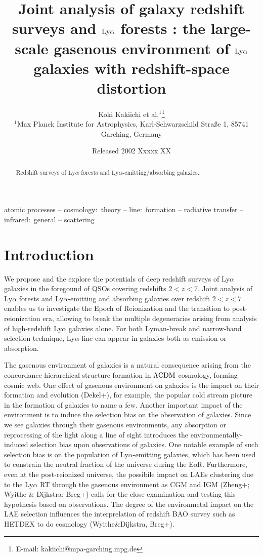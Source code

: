 \documentclass[useAMS,usenatbib,twocolumn]{mn2e}
\title[$\LyA$ forests and $\LyA$ galaxy surveys]
  {Joint analysis of galaxy redshift surveys and $\LyA$ forests \Rmnum{1}: \newline
  the large-scale gasenous environment of $\LyA$ galaxies 
  with redshift-space distortion}
\author[K. Kakiichi et al.]
{Koki Kakiichi et al,$^{1}$\thanks{E-mail: kakiichi@mpa-garching.mpg.de}
\\
$^1$Max Planck Institute for Astrophysics, Karl-Schwarzschild Stra\ss e 1, 85741 Garching, Germany
}
\date{Released 2002 Xxxxx XX}
\newcommand{\LyA}{\mbox{Ly}\alpha}
\begin{document}
\maketitle

\begin{abstract}
Redshift surveys of $\LyA$ forests and $\LyA$-emitting/absorbing galaxies. 
\end{abstract}

\begin{keywords}
atomic processes -- cosmology:\ theory -- line:\ formation -- radiative
transfer -- infrared:\ general -- scattering
\end{keywords}

\section{Introduction}
We propose and the explore the potentials of deep redshift surveys
of $\LyA$ galaxies in the foregound of QSOs covering redshifts $2<z<7$.
Joint analysis of $\LyA$ forests and $\LyA$-emitting and absorbing galaxies
over redshift $2<z<7$ enables us to investigate the Epoch of Reionization
and the transition to post-reionization era, allowing to break the multiple 
degeneracies arising from analysis of high-redshift $\LyA$ galaxies alone.
For both Lyman-break and narrow-band selection technique, $\LyA$ line can 
appear in galaxies both as emission or absorption.

The gasenous environment of galaxies is a natural consequence arising from 
the concordance hierarchical structure formation in $\rm{\Lambda CDM}$
cosmology, forming cosmic web. One effect of gasenous environment on
galaxies is the impact on their formation and evolution (Dekel+),
for example, the popular cold stream picture in the formation of galaxies 
to name a few. Another important impact of the environment is to induce
the selection bias on the observation of galaxies. Since we see galaxies
through their gasenous environments, any absorption or reprocessing of the light
along a line of sight introduces the environmentally-induced selection bias 
upon observations of galaxies. One notable example of such selection bias is 
on the population of $\LyA$-emitting galaxies, which has been used to 
constrain the neutral fraction of the universe during the EoR. 
Furthermore, even at the post-reionized universe, the possibile impact 
on LAEs clustering due to the $\LyA$ RT through the gasenous environment 
as CGM and IGM (Zheng+; Wyithe \& Dijkstra; Breg+) calls for the close 
examination and testing this hypothesis based on observations. The degree of 
the environmetal impact on the LAE selection influences the interprelation of 
redshift BAO survey such as HETDEX to do cosmology (Wyithe\&Dijkstra, Breg+). 
 
\end{document}
